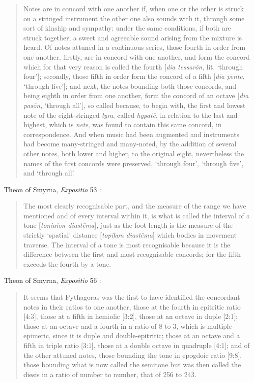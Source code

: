 \documentclass{article}
\theoremstyle{definition}
\begin{document}
\begin{quote}
Notes are in concord with one another if, when one or the other is struck on
a stringed instrument the other one also sounds with it, through some sort of
kinship and sympathy: under the same conditions, if both are struck together,
a sweet and agreeable sound arising from the mixture is heard. Of notes
attuned in a continuous series, those fourth in order from one another, firstly,
are in concord with one another, and form the concord which for that very
reason is called the fourth [{\em dia tessar\={o}n}, lit. `through four']; secondly, those
fifth in order form the concord of a fifth [{\em dia pente}, `through five']; and next,
the notes bounding both those concords, and being eighth in order from one
another, form the concord of an octave [{\em dia pas\={o}n}, `through all'], so called
because, to begin with, the first and lowest note of the eight-stringed {\em lyra}, called
{\em hypat\={e}}, in relation to the last and highest, which is {\em n\={e}t\={e}}, was found to contain
this same concord, in correspondence. And when music had been augmented
and instruments had become many-stringed and many-noted, by the addition
of several other notes, both lower and higher, to the original eight, nevertheless
the names of the first concords were preserved, `through four', `through five',
and `through all'.
\end{quote}

Theon of Smyrna, {\em Expositio} 53 \cite[p.~215]{barker}:

\begin{quote}
The most clearly recognisable part, and the measure of the range we have
mentioned and of every interval within it, is what is called the interval of a tone
[{\em toniaion diast\={e}ma}], just as the foot length is the measure of the strictly
`spatial' distance [{\em topikon diast\={e}ma}] which bodies in movement traverse. The
interval of a tone is most recognisable because it is the difference between the
first and most recognisable concords; for the fifth exceeds the fourth by a
tone.
\end{quote}

Theon of Smyrna, {\em Expositio} 56 \cite[p.~217]{barker}:

\begin{quote}
It seems that Pythagoras was the first to have identified the concordant
notes in their ratios to one another, those at the fourth in epitritic ratio [4:3],
those at a fifth in hemiolic [3:2], those at an octave in duple [2:1]; those at an
octave and a fourth in a ratio of 8 to 3, which is multiple-epimeric, since it is
duple and double-epitritic; those at an octave and a fifth in triple ratio [3:1],
those at a double octave in quadruple [4:1]; and of the other attuned notes,
those bounding the tone in epogdoic ratio [9:8], those bounding what is now
called the semitone but was then called the diesis in a ratio of number to
number, that of 256 to 243.
\end{quote}
\end{document}
